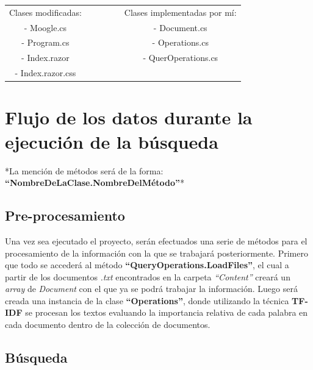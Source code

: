\documentclass[a4paper,12pt]{article}
\begin{document}
 \begin{center}
    \begin{tabular}{cccccc}
 Clases modificadas:                &   &   &   &   &        Clases implementadas por mí:\\
                   
    - Moogle.cs                     &   &   &   &   &         - Document.cs \\
    - Program.cs                    &   &   &   &   &         - Operations.cs \\
    - Index.razor                   &   &   &   &   &         - QuerOperations.cs \\
    - Index.razor.css               \\                  
 
  \end{tabular}
 

 
   \section{Flujo de los datos durante la ejecución de la búsqueda}
    *La mención de métodos será de la forma: \textbf{“NombreDeLaClase.NombreDelMétodo”}*
 
 \subsection{Pre-procesamiento}

 
 Una vez sea ejecutado el proyecto, serán efectuados una serie de métodos para el procesamiento 
 de la información con la que se trabajará posteriormente. Primero que todo se accederá al método 
 \textbf{“QueryOperations.LoadFiles”}, el cual a partir de los documentos \emph{.txt} encontrados en la carpeta \emph{“Content”}
 creará un \emph{array} de \emph{Document} con el que ya se podrá trabajar la información.
 Luego será creada una instancia de la clase \textbf{“Operations”}, donde utilizando la técnica \textbf{TF-IDF} se procesan los
 textos evaluando la importancia relativa de cada palabra en cada documento dentro de la colección de documentos.


 \subsection{Búsqueda}


\end{center}
\end{document}
